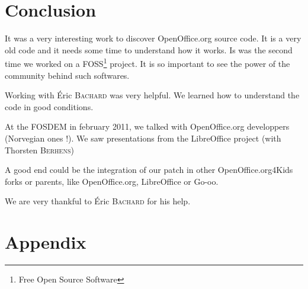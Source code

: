\documentclass[a4paper,11pt]{article}
\begin{document}
\section*{Conclusion}

It was a very interesting work to discover OpenOffice.org source code. It is a very
old code and it needs some time to understand how it works. Is was the second
time we worked on a FOSS\footnote{Free Open Source Software} project. It is so
important to see the power of the community behind such softwares. 

Working with Éric \textsc{Bachard} was very helpful. We learned how to
understand the code in good conditions.

At the FOSDEM in february 2011, we talked with OpenOffice.org developpers
(Norvegian ones !). We saw presentations from the LibreOffice project (with
Thorsten \textsc{Berhens})

A good end could be the integration of our patch in other OpenOffice.org4Kids
forks or parents, like OpenOffice.org, LibreOffice or Go-oo.

We are very thankful to Éric \textsc{Bachard} for his help.

\newpage
{}
\listoffigures

\newpage
{}
\section*{Appendix}
\end{document}
